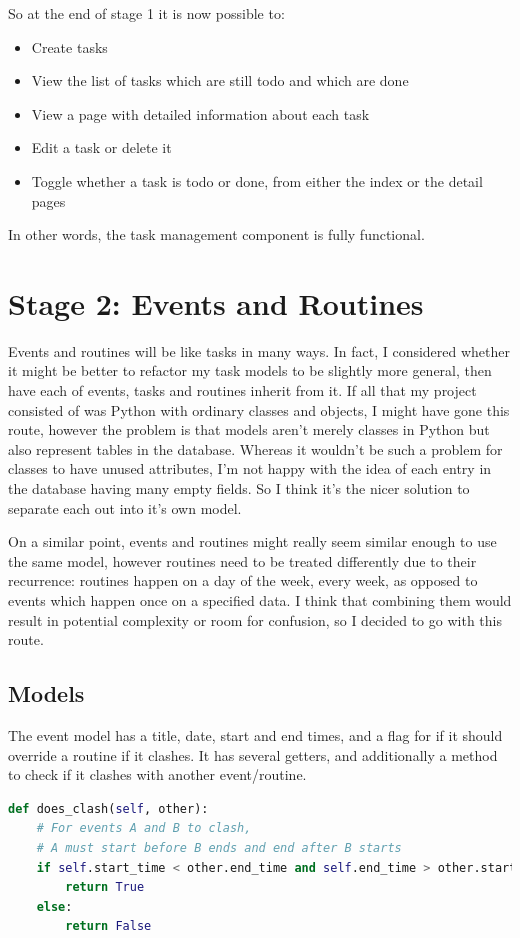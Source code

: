 \documentclass{article}
\begin{document}
So at the end of stage 1 it is now possible to:
\begin{itemize}
  \item Create tasks
  \item View the list of tasks which are still todo and which are done
  \item View a page with detailed information about each task
  \item Edit a task or delete it
  \item Toggle whether a task is todo or done,
    from either the index or the detail pages
\end{itemize}

In other words,
the task management component is fully functional.

\section{Stage 2: Events and Routines}
Events and routines will be like tasks in many ways.
In fact,
I considered whether it might be better to refactor my task models to be slightly more general,
then have each of events, tasks and routines inherit from it.
If all that my project consisted of was Python with ordinary classes and objects,
I might have gone this route,
however the problem is that models aren't merely classes in Python but also represent tables in the database.
Whereas it wouldn't be such a problem for classes to have unused attributes,
I'm not happy with the idea of each entry in the database having many empty fields.
So I think it's the nicer solution to separate each out into it's own model.

On a similar point,
events and routines might really seem similar enough to use the same model,
however routines need to be treated differently due to their recurrence:
routines happen on a day of the week,
every week,
as opposed to events which happen once on a specified data.
I think that combining them would result in potential complexity or room for confusion,
so I decided to go with this route.

\subsection{Models}
The event model has a title, date, start and end times,
and a flag for if it should override a routine if it clashes.
It has several getters,
and additionally a method to check if it clashes with another event/routine.

\begin{lstlisting}[language=Python]
def does_clash(self, other):
    # For events A and B to clash,
    # A must start before B ends and end after B starts
    if self.start_time < other.end_time and self.end_time > other.start_time:
        return True
    else:
        return False
\end{lstlisting}
\end{document}
